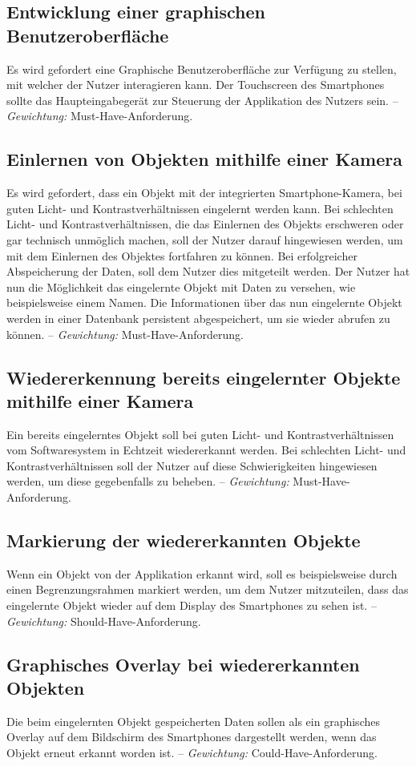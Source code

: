 \documentclass[oneside]{ausarbeitung}
\begin{document}
\subsection{Entwicklung einer graphischen Benutzeroberfläche}
Es wird gefordert eine Graphische Benutzeroberfläche zur Verfügung zu stellen, mit welcher der Nutzer interagieren kann. Der Touchscreen des Smartphones sollte das Haupteingabegerät zur Steuerung der Applikation des Nutzers sein. -- \textit{Gewichtung:} Must-Have-Anforderung.
\subsection{Einlernen von Objekten mithilfe einer Kamera}
Es wird gefordert, dass ein Objekt mit der integrierten Smartphone-Kamera, bei guten Licht- und Kontrastverhältnissen eingelernt werden kann. Bei schlechten Licht- und Kontrastverhältnissen, die das Einlernen des Objekts erschweren oder gar technisch unmöglich machen, soll der Nutzer darauf hingewiesen werden, um mit dem Einlernen des Objektes fortfahren zu können. Bei erfolgreicher Abspeicherung der Daten, soll dem Nutzer dies mitgeteilt werden. Der Nutzer hat nun die Möglichkeit das eingelernte Objekt mit Daten zu versehen, wie beispielsweise einem Namen. Die Informationen über das nun eingelernte Objekt werden in einer Datenbank persistent abgespeichert, um sie wieder abrufen zu können. -- \textit{Gewichtung:} Must-Have-Anforderung.

\subsection{Wiedererkennung bereits eingelernter Objekte mithilfe einer Kamera}
Ein bereits eingelerntes Objekt soll bei guten Licht- und Kontrastverhältnissen vom Softwaresystem in Echtzeit wiedererkannt werden. Bei schlechten Licht- und Kontrastverhältnissen soll der Nutzer auf diese Schwierigkeiten hingewiesen werden, um diese gegebenfalls zu beheben. -- \textit{Gewichtung:} Must-Have-Anforderung.

\subsection{Markierung der wiedererkannten Objekte}
Wenn ein Objekt von der Applikation erkannt wird, soll es beispielsweise durch einen Begrenzungsrahmen markiert werden, um dem Nutzer mitzuteilen, dass das eingelernte Objekt wieder auf dem Display des Smartphones zu sehen ist. -- \textit{Gewichtung:} Should-Have-Anforderung.
\subsection{Graphisches Overlay bei wiedererkannten Objekten}
Die beim eingelernten Objekt gespeicherten Daten sollen als ein graphisches Overlay auf dem Bildschirm des Smartphones dargestellt werden, wenn das Objekt erneut erkannt worden ist. -- \textit{Gewichtung:} Could-Have-Anforderung.
\end{document}
